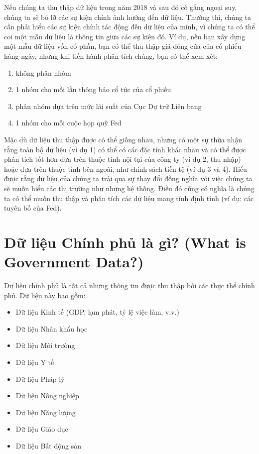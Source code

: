 Nếu chúng ta thu thập dữ liệu trong năm 2018 và sau đó cố gắng ngoại suy, chúng ta sẽ bỏ lỡ các sự kiện chính ảnh hưởng đến dữ liệu. Thường thì, chúng ta cần phải hiểu các sự kiện chính tác động đến dữ liệu của mình, vì chúng ta có thể coi một mẫu dữ liệu là thông tin giữa các sự kiện đó. Ví dụ, nếu bạn xây dựng một mẫu dữ liệu vốn cổ phần, bạn có thể thu thập giá đóng cửa của cổ phiếu hàng ngày, nhưng khi tiến hành phân tích chúng, bạn có thể xem xét:
\begin{enumerate}
    \item không phân nhóm
    \item 1 nhóm cho mỗi lần thông báo cổ tức của cổ phiếu
    \item phân nhóm dựa trên mức lãi suất của Cục Dự trữ Liên bang
    \item 1 nhóm cho mỗi cuộc họp quỹ Fed
\end{enumerate}

Mặc dù dữ liệu thu thập được có thể giống nhau, nhưng có một sự thừa nhận rằng toàn bộ dữ liệu (ví dụ 1) có thể có các đặc tính khác nhau và có thể được phân tích tốt hơn dựa trên thuộc tính nội tại của công ty (ví dụ 2, thu nhập) hoặc dựa trên thuộc tính bên ngoài, như chính sách tiền tệ (ví dụ 3 và 4). Hiểu được rằng dữ liệu của chúng ta trải qua sự thay đổi đồng nghĩa với việc chúng ta sẽ muốn hiểu các thị trường như những hệ thống. Điều đó cũng có nghĩa là chúng ta có thể muốn thu thập và phân tích các dữ liệu mang tính định tính (ví dụ: các tuyên bố của Fed).

\section[Dữ liệu Chính phủ là gì?]{Dữ liệu Chính phủ là gì? (What is Government Data?)}

Dữ liệu chính phủ là tất cả những thông tin được thu thập bởi các thực thể chính phủ. Dữ liệu này bao gồm:
\begin{itemize}
    \item Dữ liệu Kinh tế (GDP, lạm phát, tỷ lệ việc làm, v.v.)
    \item Dữ liệu Nhân khẩu học
    \item Dữ liệu Môi trường
    \item Dữ liệu Y tế
    \item Dữ liệu Pháp lý
    \item Dữ liệu Nông nghiệp
    \item Dữ liệu Năng lượng
    \item Dữ liệu Giáo dục
    \item Dữ liệu Bất động sản
\end{itemize}

